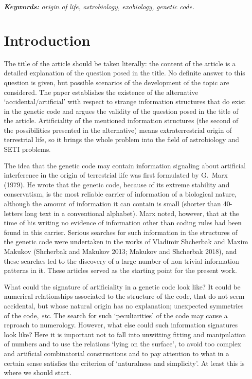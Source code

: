 \documentclass[12pt]{article}
\begin{document}
\medskip
\noindent\textit{\textbf{Keywords:} origin of life, astrobiology, exobiology, genetic code.}

\setcounter{page}{23}

\section{Introduction}

The title of the article should be taken literally: the content of the article is a detailed explanation of the question posed in the title. No definite answer to this question is given, but possible scenarios of the development of the topic are considered. The paper establishes the existence of the alternative `accidental/artificial' with respect to strange information structures that do exist in the genetic code and argues the validity of the question posed in the title of the article. Artificiality of the mentioned information structures (the second of the possibilities presented in the alternative) means extraterrestrial origin of terrestrial life, so it brings the whole problem into the field of astrobiology and SETI problems.

The idea that the genetic code may contain information signaling about artificial interference in the origin of terrestrial life was first formulated by G.~Marx (1979). He wrote that the genetic code, because of its extreme stability and conservatism, is the most reliable carrier of information of a biological nature, although the amount of information it can contain is small (shorter than 40-letters long text in a conventional alphabet). Marx noted, however, that at the time of his writing no evidence of information other than coding rules had been found in this carrier. Serious searches for such information in the structures of the genetic code were undertaken in the works of Vladimir Shcherbak and Maxim Makukov (Shcherbak and Makukov 2013; Makukov and Shcherbak 2018), and these searches led to the discovery of a large number of non-trivial information patterns in it. These articles served as the starting point for the present work.

What could the signature of artificiality in a genetic code look like? It could be numerical relationships associated to the structure of the code, that do not seem accidental, but whose natural origin has no explanation; unexpected symmetries of the code, \textit{etc}. The search for such `peculiarities' of the code may cause a reproach to numerology. However, what else could such information signatures look like? Here it is important not to fall into unwitting fitting and manipulation of numbers and to use the relations `lying on the surface', to avoid too complex and artificial combinatorial constructions and to pay attention to what in a certain sense satisfies the criterion of `naturalness and simplicity'. At least this is where we should start.
\end{document}
